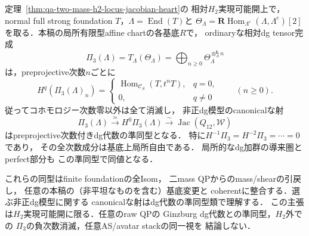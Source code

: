 \begin{theorem}
\label{thm:qa-q12-h2-serre-dg-formality}
定理~\ref{thm:qa-two-mass-h2-locus-jacobian-heart}の
相対$H_2$実現可能開上で，normal full strong
foundation $T$，$\Lambda=\operatorname{End}(T)$と
$\Theta_\Lambda=
\mathbf R\operatorname{Hom}_{\Lambda^e}(\Lambda,\Lambda^e)[2]$
を取る．本稿の局所有限型affine chartの各基底$R$で，
ordinaryな相対dg tensor完成
\[
 \Pi_3(\Lambda)=T_\Lambda(\Theta_\Lambda)
  =\bigoplus_{n\ge0}
       \Theta_\Lambda^{\otimes_\Lambda^{\mathbf L}n}
\]
は，preprojective次数$n$ごとに
\[
 H^q\!\left(\Pi_3(\Lambda)_n\right)=
 \begin{cases}
  \operatorname{Hom}_{\mathcal C_S}(T,t^nT),&q=0,\\
  0,&q\ne0
 \end{cases}
 \qquad(n\ge0).
 \tag{DG0}\label{eq:qa-q12-all-dg-cohomology-concentrates}
\]
従ってコホモロジー次数零以外は全て消滅し，
非正dg模型のcanonicalな射
\[
 \boxed{\quad
 \Pi_3(\Lambda)\xrightarrow{\ \simeq\ }
 H^0\Pi_3(\Lambda)
 \xrightarrow{\ \sim\ }\operatorname{Jac}(Q_{12},\mathcal W)
 \quad}
 \tag{DF0}\label{eq:qa-q12-h2-serre-dg-formality}
\]
はpreprojective次数付きdg代数の準同型となる．
特に$H^{-1}\Pi_3=H^{-2}\Pi_3=\cdots=0$であり，
その全次数成分は基底上局所自由である．
局所的なdg加群の導来圏とperfect部分も
この準同型で同値となる．

これらの同型はfinite foundationの全Isom，
二mass QPからのmass/shearの引戻し，
任意の本稿の（非平坦なものを含む）基底変更と
coherentに整合する．選ぶ非正dg模型に関する
canonicalな射はdg代数の準同型類で理解する．
この主張は$H_2$実現可能開に限る．任意のraw QPの
Ginzburg dg代数との準同型，$H_2$外での
$\Pi_3$の負次数消滅，任意AS/avatar stackの同一視を
結論しない．
\end{theorem}
